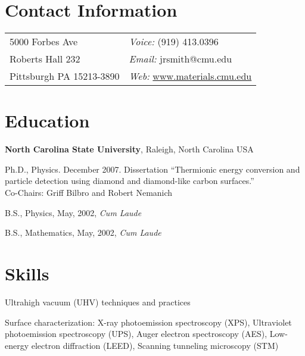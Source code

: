 \documentclass[letterpaper,margin,line]{res}
\newenvironment{list1}{
  \begin{list}{\ding{113}}{%
      \setlength{\itemsep}{0in}
      \setlength{\parsep}{0in} \setlength{\parskip}{0in}
      \setlength{\topsep}{0in} \setlength{\partopsep}{0in} 
      \setlength{\leftmargin}{0.17in}}}{\end{list}}
\begin{document}

\begin{resume}
\section{\sc Contact Information}
\vspace{.05in}
\begin{tabular}{@{}p{2in}p{4in}}
5000 Forbes Ave 		& {\it Voice:} (919) 413.0396\\
Roberts Hall 232        	& {\it Email:} {jrsmith@cmu.edu} \\
Pittsburgh PA 15213-3890	& {\it Web:} \href{http://www.materials.cmu.edu}{www.materials.cmu.edu}
\end{tabular}


\section{\sc Education}

{\bf North Carolina State University}, Raleigh, North Carolina USA\\
\vspace*{-.1in}
\begin{list1}
\item[] Ph.D., Physics. December 2007. Dissertation ``Thermionic energy conversion and particle detection using diamond and diamond-like carbon surfaces.'' \\Co-Chairs: Griff Bilbro and Robert Nemanich
\item[] B.S., Physics,  May, 2002, \textit{Cum Laude}
\item[] B.S., Mathematics, May, 2002, \textit{Cum Laude}
\end{list1}



\section{\sc Skills} 
Ultrahigh vacuum (UHV) techniques and practices

\vspace*{-2.5mm}
Surface characterization: X-ray photoemission spectroscopy (XPS), Ultraviolet photoemission spectroscopy (UPS), Auger electron spectroscopy (AES), Low-energy electron diffraction (LEED), Scanning tunneling microscopy (STM)


\end{resume}
\end{document}
